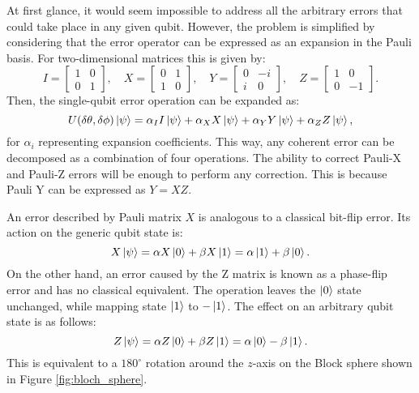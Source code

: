At first glance, it would seem impossible to address all the arbitrary errors that could take place in any given qubit. However, the problem is simplified by considering that the error operator can be expressed as an expansion in the Pauli basis. For two-dimensional matrices this is given by:
\begin{equation}
    I=\begin{bmatrix}
        1&0\\
        0&1
    \end{bmatrix},\quad
    X=\begin{bmatrix}
        0&1\\
        1&0
    \end{bmatrix}, \quad
    Y=\begin{bmatrix}
        0&-i\\
        i&0
    \end{bmatrix},\quad
    Z=\begin{bmatrix}
        1&0\\
        0&-1
    \end{bmatrix}.
\end{equation}
Then, the single-qubit error operation can be expanded as:
\begin{equation}
    U(\delta\theta,\delta\phi)\ket{\psi}=\alpha_I I\ket{\psi} + \alpha_X X\ket{\psi} + \alpha_Y Y\ket{\psi} + \alpha_Z Z\ket{\psi},
\end{equation}
for $\alpha_i$ representing expansion coefficients. This way, any coherent error can be decomposed as a combination of four operations. The ability to correct Pauli-X and Pauli-Z errors will be enough to perform any correction. This is because Pauli Y can be expressed as $Y=XZ$. 

An error described by Pauli matrix $X$ is analogous to a classical bit-flip error. Its action on the generic qubit state is:
\begin{equation}
    X\ket{\psi}=\alpha X\ket{0}+\beta X\ket{1} = \alpha \ket{1}+\beta \ket{0}.
\end{equation}
On the other hand, an error caused by the Z matrix is known as a phase-flip error and has no classical equivalent. The operation leaves the $\ket{0}$ state unchanged, while mapping state $\ket{1}$ to $-\ket{1}$. The effect on an arbitrary qubit state is as follows:
\begin{equation}
    Z\ket{\psi}=\alpha Z\ket{0}+\beta Z\ket{1} = \alpha \ket{0} -\beta \ket{1}.
\end{equation}
This is equivalent to a $180^\circ$ rotation around the $z$-axis on the Block sphere shown in Figure \ref{fig:bloch_sphere}.

